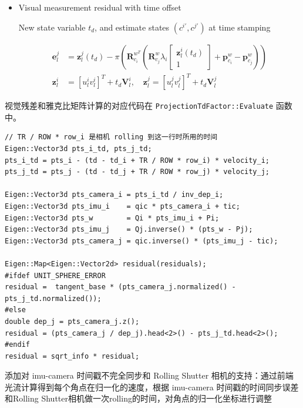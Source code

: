 \documentclass[12pt,a4paper]{article}
\begin{document}
\begin{enumerate}
\begin{itemize}
\item Visual measurement residual with time offset

New state variable $t_d$, and estimate states $(c^{i'}, c^{j'})$ at time stamping

\begin{equation}
\begin{aligned} 
\mathbf{e}_{l}^{j} &=
\mathbf{z}_{l}^{j}\left(t_{d}\right)-\pi\left(\mathbf{R}_{c_{i}}^{w^{T}}\left(\mathbf{R}_{c_{j}}^{w} \lambda_{i}\left[\begin{array}{c}{\mathbf{z}_{l}^{i}\left(t_{d}\right)} \\ {1}\end{array}\right]+\mathbf{p}_{c_{i}}^{w}-\mathbf{p}_{c_{j}}^{w}\right)\right) \\ 
\mathbf{z}_{l}^{i} &=\left[u_{l}^{i} v_{l}^{i}\right]^{T}+t_{d} \mathbf{V}_{l}^{i}, \quad 
\mathbf{z}_{l}^{j}=\left[u_{l}^{j} v_{l}^{j}\right]^{T}+t_{d} \mathbf{V}_{l}^{j} 
\end{aligned}
\end{equation}

\end{itemize}

视觉残差和雅克比矩阵计算的对应代码在 \verb|ProjectionTdFactor::Evaluate| 函数中。

\begin{lstlisting}
// TR / ROW * row_i 是相机 rolling 到这一行时所用的时间
Eigen::Vector3d pts_i_td, pts_j_td;
pts_i_td = pts_i - (td - td_i + TR / ROW * row_i) * velocity_i;
pts_j_td = pts_j - (td - td_j + TR / ROW * row_j) * velocity_j;

Eigen::Vector3d pts_camera_i = pts_i_td / inv_dep_i;
Eigen::Vector3d pts_imu_i    = qic * pts_camera_i + tic;
Eigen::Vector3d pts_w        = Qi * pts_imu_i + Pi;
Eigen::Vector3d pts_imu_j    = Qj.inverse() * (pts_w - Pj);
Eigen::Vector3d pts_camera_j = qic.inverse() * (pts_imu_j - tic);

Eigen::Map<Eigen::Vector2d> residual(residuals);
#ifdef UNIT_SPHERE_ERROR
residual =  tangent_base * (pts_camera_j.normalized() - pts_j_td.normalized());
#else
double dep_j = pts_camera_j.z();
residual = (pts_camera_j / dep_j).head<2>() - pts_j_td.head<2>();
#endif
residual = sqrt_info * residual;
\end{lstlisting}

添加对 imu-camera 时间戳不完全同步和 Rolling Shutter 相机的支持：通过前端光流计算得到每个角点在归一化的速度，根据 imu-camera 时间戳的时间同步误差和Rolling Shutter相机做一次rolling的时间，对角点的归一化坐标进行调整

\end{enumerate}
\end{document}
